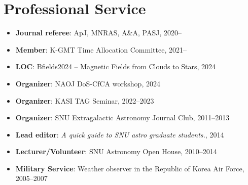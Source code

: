 \documentclass[11pt,letterpaper,roman]{moderncv}        %
\begin{document}

\section{Professional Service}
\begin{itemize}
\setlength\itemsep{0.0em}
\item {\bfseries Journal referee}: ApJ, MNRAS, A\&A, PASJ, 2020--
\item {\bfseries Member}: K-GMT Time Allocation Committee, 2021--
\item {\bfseries LOC}: Bfields2024 -- Magnetic Fields from Clouds to Stars, 2024
\item {\bfseries Organizer}: NAOJ DoS-CfCA workshop, 2024
\item {\bfseries Organizer}: KASI TAG Seminar, 2022--2023
\item {\bfseries Organizer}: SNU Extragalactic Astronomy Journal Club, 2011--2013
\item {\bfseries Lead editor}: \textit{A quick guide to SNU astro graduate students.}, 2014
\item {\bfseries Lecturer/Volunteer}: SNU Astronomy Open House, 2010--2014
\item {\bfseries Military Service}: Weather observer in the Republic of Korea Air Force, 2005--2007
\end{itemize}
\end{document}
